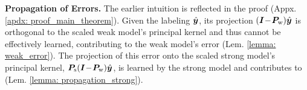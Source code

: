 \textbf{Propagation of Errors.} The earlier intuition is reflected in the proof (Appx. \ref{apdx: proof_main_theorem}). Given the labeling $\hat{{\bm{y}}}$, its projection $({\bm{I}}\!-\!{\bm{P}}_{\text{w}})\hat{{\bm{y}}}$ is orthogonal to the scaled weak model's principal kernel and thus cannot be effectively learned, contributing to the weak model's error (Lem. \ref{lemma: weak_error}). The projection of this error onto the scaled strong model's principal kernel, ${\bm{P}}_{\text{s}}({\bm{I}}\!-\!{\bm{P}}_{\text{w}})\hat{{\bm{y}}}$, is learned by the strong model and contributes to \predgap{} (Lem. \ref{lemma: propagation_strong}).









